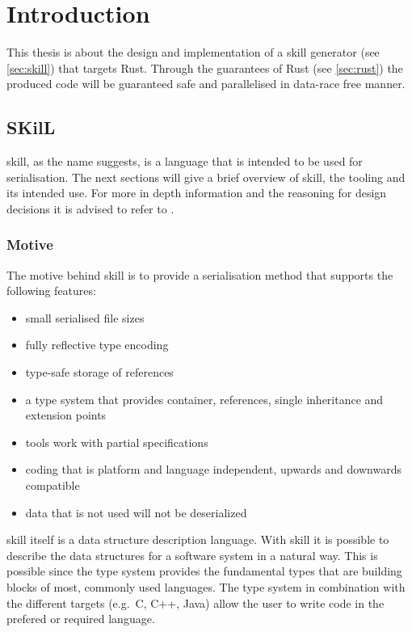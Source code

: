 \documentclass[thesis]{subfiles}
\begin{document}
\chapter{Introduction}
This thesis is about the design and implementation of a \gls{skill} generator (see \autoref{sec:skill}) that targets Rust.
Through the guarantees of Rust (see \autoref{sec:rust}) the produced code will be guaranteed safe and parallelised in data-race free manner.

\section{SKilL}\label{sec:skill}
  \gls{skill}, as the name suggests, is a language that is intended to be used for serialisation.
  The next sections will give a brief overview of \gls{skill}, the tooling and its intended use.
  For more in depth information and the reasoning for design decisions it is advised to refer to \autocites{skill-tr}{skill-dis}.

  \subsection{ Motive}
    The motive behind \gls{skill} is to provide a serialisation method that supports the following features\autocite{skill-tr}:
    \begin{itemize}
      \item small serialised file sizes
      \item fully reflective type encoding
      \item type-safe storage of references
      \item a type system that provides container, references, single inheritance and extension points
      \item tools work with partial specifications
      \item coding that is platform and language independent, upwards and downwards compatible
      \item data that is not used will not be deserialized
    \end{itemize}

    \gls{skill} itself is a data structure description language.
    With \gls{skill} it is possible to describe the data structures for a software system in a natural way.
    This is possible since the type system provides the fundamental types that are building blocks of most, commonly used languages.
    The type system in combination with the different targets (e.g.\ C, C++, Java) allow the user to write code in the prefered or required language.
\end{document}
